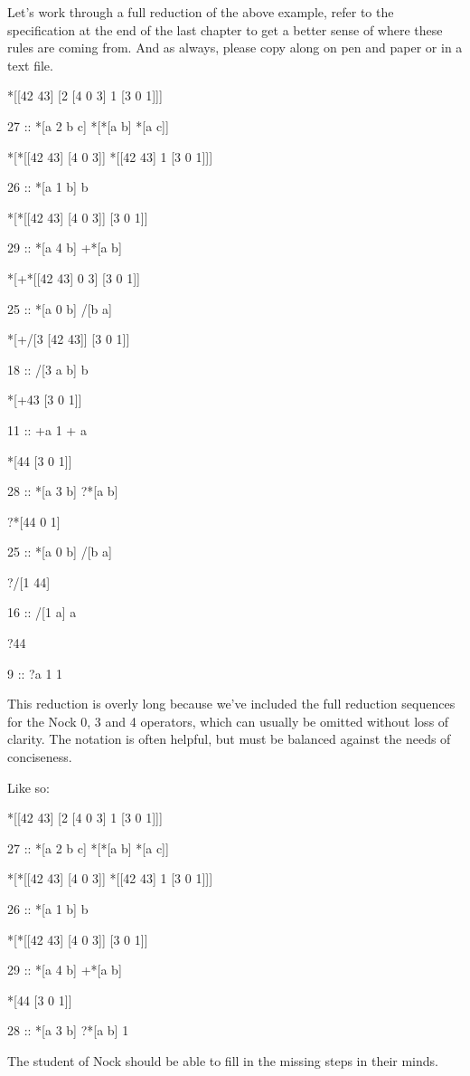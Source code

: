 Let's work through a full reduction of the above example, refer to the specification at the end of the last chapter to get a better sense of where these rules are coming from. And as always, please copy along on pen and paper or in a text file.

\begin{code}
*[[42 43] [2 [4 0 3] 1 [3 0 1]]]

      27 ::    *[a 2 b c]       *[*[a b] *[a c]]


*[*[[42 43] [4 0 3]] *[[42 43] 1 [3 0 1]]]

      26 ::    *[a 1 b]         b


*[*[[42 43] [4 0 3]] [3 0 1]]

      29 ::    *[a 4 b]         +*[a b]

*[+*[[42 43] 0 3] [3 0 1]]

      25 ::    *[a 0 b]         /[b a]

*[+/[3 [42 43]] [3 0 1]]

      18 ::    /[3 a b]         b

*[+43 [3 0 1]]

      11 ::    +a               1 + a

*[44 [3 0 1]]

      28 ::    *[a 3 b]         ?*[a b]

?*[44 0 1]

      25 ::    *[a 0 b]         /[b a]

?/[1 44]

      16 ::    /[1 a]           a

?44

      9  ::    ?a               1
1
\end{code}

This reduction is overly long because we've included the full reduction sequences for the Nock 0, 3 and 4 operators, which can usually be omitted without loss of clarity. The notation is often helpful, but must be balanced against the needs of conciseness.

Like so:

\begin{code}
*[[42 43] [2 [4 0 3] 1 [3 0 1]]]

    27 ::    *[a 2 b c]       *[*[a b] *[a c]]


*[*[[42 43] [4 0 3]] *[[42 43] 1 [3 0 1]]]

    26 ::    *[a 1 b]         b

*[*[[42 43] [4 0 3]] [3 0 1]]

    29 ::    *[a 4 b]         +*[a b]

*[44 [3 0 1]]

    28 ::    *[a 3 b]         ?*[a b]
1
\end{code}
The student of Nock should be able to fill in the missing steps in their minds.

